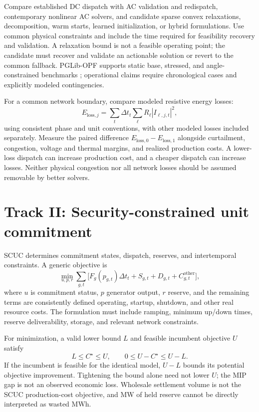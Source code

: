 \documentclass[11pt,letterpaper]{article}
\begin{document}
Compare established DC dispatch with AC validation and redispatch, contemporary nonlinear AC solvers, and candidate sparse convex relaxations, decomposition, warm starts, learned initialization, or hybrid formulations. Use common physical constraints and include the time required for feasibility recovery and validation. A relaxation bound is not a feasible operating point; the candidate must recover and validate an actionable solution or revert to the common fallback. PGLib-OPF supports static base, stressed, and angle-constrained benchmarks \cite{pglibopf}; operational claims require chronological cases and explicitly modeled contingencies.

For a common network boundary, compare modeled resistive energy losses:
\begin{equation}
E_{\mathrm{loss},j}=\sum_t\Delta t_t\sum_{\ell}R_{\ell}|I_{\ell,j,t}|^2,
\end{equation}
using consistent phase and unit conventions, with other modeled losses included separately. Measure the paired difference $E_{\mathrm{loss},0}-E_{\mathrm{loss},1}$ alongside curtailment, congestion, voltage and thermal margins, and realized production costs. A lower-loss dispatch can increase production cost, and a cheaper dispatch can increase losses. Neither physical congestion nor all network losses should be assumed removable by better solvers.

\section{Track II: Security-constrained unit commitment}
SCUC determines commitment states, dispatch, reserves, and intertemporal constraints. A generic objective is
\begin{equation}
\min_{u,p,r}\sum_{g,t}\big[F_g(p_{g,t})\Delta t_t+S_{g,t}+D_{g,t}+C^{\mathrm{other}}_{g,t}\big],
\end{equation}
where $u$ is commitment status, $p$ generator output, $r$ reserve, and the remaining terms are consistently defined operating, startup, shutdown, and other real resource costs. The formulation must include ramping, minimum up/down times, reserve deliverability, storage, and relevant network constraints.

For minimization, a valid lower bound $L$ and feasible incumbent objective $U$ satisfy
\begin{equation}
L\leq C^\star\leq U,\qquad 0\leq U-C^\star\leq U-L.
\end{equation}
If the incumbent is feasible for the identical model, $U-L$ bounds its potential objective improvement. Tightening the bound alone need not lower $U$; the MIP gap is not an observed economic loss. Wholesale settlement volume is not the SCUC production-cost objective, and MW of held reserve cannot be directly interpreted as wasted MWh.
\end{document}
